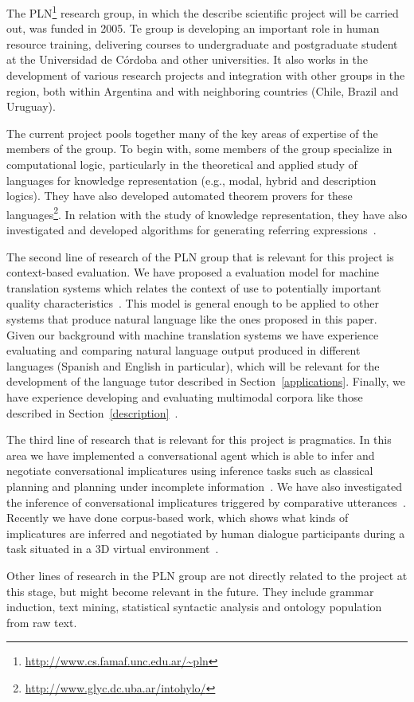 
The PLN\footnote{\url{http://www.cs.famaf.unc.edu.ar/~pln}} research group, 
in which the describe scientific project will be carried out, was funded in 2005.
Te group is developing an important role in human resource training,
delivering courses to undergraduate and postgraduate student at the Universidad
de C\'ordoba and
other universities. It also works in the development of various research
projects and integration with other groups in the region, both within Argentina and
with neighboring countries (Chile, Brazil and Uruguay). 

The current project pools together many of the key areas of expertise of the members
of the group. To begin with, some members of the group specialize in computational
logic, particularly in the theoretical and applied study of languages for
knowledge representation (e.g., modal, hybrid and description logics). They
have also developed  automated theorem provers for these
languages\footnote{\url{http://www.glyc.dc.uba.ar/intohylo/}}. In relation with 
the study of knowledge representation, they have also investigated and developed
algorithms for generating referring expressions~\cite{AKS08}.

The second line of research of the PLN group that is relevant for this project
is context-based evaluation. We have proposed a evaluation model
for machine translation systems which relates the context of use  to potentially important quality
characteristics~\cite{estr:impr08,estr:femt09}. This model is general enough to
be applied to other systems that produce natural language like the ones
proposed in this paper. 
Given our background with machine translation systems we have experience evaluating and
comparing natural language output produced in different languages (Spanish and
English in particular), which will be relevant for the development of the
language tutor described in Section~\ref{applications}. 
Finally, we have
experience developing and evaluating   
 multimodal corpora like those described in Section~\ref{description}~\cite{multieval}.

The third line of research that is relevant for this project is pragmatics. In
this area we have implemented a conversational agent which is able to infer and
negotiate conversational implicatures using inference tasks such as
classical planning and planning under incomplete information~\cite{benotti09b}.
We have also investigated the inference of conversational implicatures triggered
by comparative utterances~\cite{benotti09a}. Recently we have done corpus-based
work, which shows what kinds of implicatures are inferred and negotiated by
human dialogue participants during a task situated in a 3D
virtual environment~\cite{benotti09c}. 

Other lines of research in the PLN group are not directly related
to the project at this stage, but might become relevant in the
future. They include grammar induction, text mining, statistical syntactic analysis
and ontology population from raw text. 





